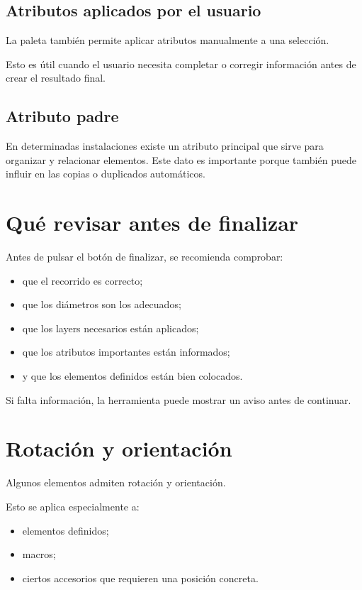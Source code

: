 \subsection{Atributos aplicados por el usuario}

La paleta también permite aplicar atributos manualmente a una selección.

Esto es útil cuando el usuario necesita completar o corregir información antes de crear el resultado final.

\subsection{Atributo padre}

En determinadas instalaciones existe un atributo principal que sirve para organizar y relacionar elementos. Este dato es importante porque también puede influir en las copias o duplicados automáticos.

\section{Qué revisar antes de finalizar}

Antes de pulsar el botón de finalizar, se recomienda comprobar:

\begin{itemize}
\item que el recorrido es correcto;
\item que los diámetros son los adecuados;
\item que los layers necesarios están aplicados;
\item que los atributos importantes están informados;
\item y que los elementos definidos están bien colocados.
\end{itemize}

Si falta información, la herramienta puede mostrar un aviso antes de continuar.


\section{Rotación y orientación}

Algunos elementos admiten rotación y orientación.

Esto se aplica especialmente a:

\begin{itemize}
\item elementos definidos;
\item macros;
\item ciertos accesorios que requieren una posición concreta.
\end{itemize}

